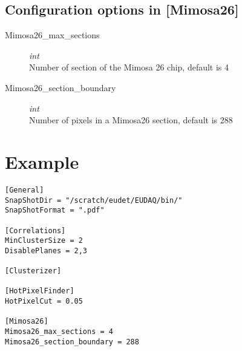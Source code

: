 \documentclass{article}
\begin{document}
\subsection{Configuration options in [Mimosa26]}
\begin{description}
\item[Mimosa26\_max\_sections] {\it int} \\
Number of section of the Mimosa 26 chip, default is 4   
\item[Mimosa26\_section\_boundary] {\it int} \\ 
Number of pixels in a Mimosa26 section, default is 288
\end{description}

\section{Example}
\begin{verbatim}
[General]
SnapShotDir = "/scratch/eudet/EUDAQ/bin/"
SnapShotFormat = ".pdf"

[Correlations]
MinClusterSize = 2
DisablePlanes = 2,3

[Clusterizer]

[HotPixelFinder]
HotPixelCut = 0.05

[Mimosa26]
Mimosa26_max_sections = 4 
Mimosa26_section_boundary = 288
\end{verbatim}
\end{document}
